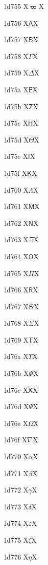 \documentclass[11pt]{article}
\begin{document}
1d755 X{\ensuremath{\boldsymbol{\varpi}}}X

1d756 X{\ensuremath{\mathsf{A}}}X

1d757 X{\ensuremath{\mathsf{B}}}X

1d758 X{\ensuremath{\mathsf{\Gamma}}}X

1d759 X{\ensuremath{\mathsf{\Delta}}}X

1d75a X{\ensuremath{\mathsf{E}}}X

1d75b X{\ensuremath{\mathsf{Z}}}X

1d75c X{\ensuremath{\mathsf{H}}}X

1d75d X{\ensuremath{\mathsf{\Theta}}}X

1d75e X{\ensuremath{\mathsf{I}}}X

1d75f X{\ensuremath{\mathsf{K}}}X

1d760 X{\ensuremath{\mathsf{\Lambda}}}X

1d761 X{\ensuremath{\mathsf{M}}}X

1d762 X{\ensuremath{\mathsf{N}}}X

1d763 X{\ensuremath{\mathsf{\Xi}}}X

1d764 X{\ensuremath{\mathsf{O}}}X

1d765 X{\ensuremath{\mathsf{\Pi}}}X

1d766 X{\ensuremath{\mathsf{R}}}X

1d767 X{\ensuremath{\mathsf{\varTheta}}}X

1d768 X{\ensuremath{\mathsf{\Sigma}}}X

1d769 X{\ensuremath{\mathsf{T}}}X

1d76a X{\ensuremath{\mathsf{\Upsilon}}}X

1d76b X{\ensuremath{\mathsf{\Phi}}}X

1d76c X{\ensuremath{\mathsf{X}}}X

1d76d X{\ensuremath{\mathsf{\Psi}}}X

1d76e X{\ensuremath{\mathsf{\Omega}}}X

1d76f X{\ensuremath{\mathsf{\nabla}}}X

1d770 X{\ensuremath{\mathsf{\alpha}}}X

1d771 X{\ensuremath{\mathsf{\beta}}}X

1d772 X{\ensuremath{\mathsf{\gamma}}}X

1d773 X{\ensuremath{\mathsf{\delta}}}X

1d774 X{\ensuremath{\mathsf{\varepsilon}}}X

1d775 X{\ensuremath{\mathsf{\zeta}}}X

1d776 X{\ensuremath{\mathsf{\eta}}}X
\end{document}
